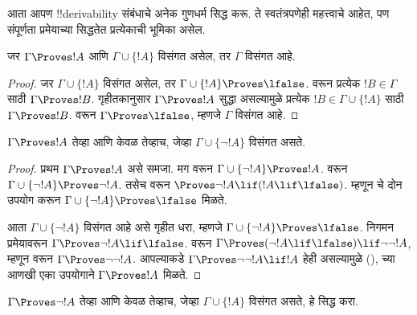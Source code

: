 \documentclass[../../../include/open-logic-section]{subfiles}
\begin{document}
      {}
      {}


आता आपण !!{derivability} संबंधाचे अनेक गुणधर्म सिद्ध करू. ते स्वतंत्रपणेही
महत्त्वाचे आहेत, पण संपूर्णता प्रमेयाच्या सिद्धतेत प्रत्येकाची भूमिका असेल.

\begin{prop}
  जर $\Gamma \Proves !A$ आणि $\Gamma \cup \{!A\}$ विसंगत असेल, तर
  $\Gamma$ विसंगत आहे.
\end{prop}

\begin{proof}
  जर $\Gamma \cup \{!A\}$ विसंगत असेल, तर $\Gamma \cup \{!A\}
  \Proves \lfalse$.  वरून प्रत्येक
  $!B \in \Gamma$ साठी $\Gamma \Proves !B$. गृहीतकानुसार
  $\Gamma \Proves !A$ सुद्धा असल्यामुळे प्रत्येक $!B \in \Gamma \cup
  \{!A\}$ साठी $\Gamma \Proves !B$. 
  वरून $\Gamma \Proves \lfalse$, म्हणजे $\Gamma$ विसंगत आहे.
\end{proof}

\begin{prop}
$\Gamma \Proves !A$ तेव्हा आणि केवळ तेव्हाच, जेव्हा $\Gamma \cup \{\lnot !A\}$
विसंगत असते.
\end{prop}

\begin{proof}
प्रथम $\Gamma \Proves !A$ असे समजा. मग 
वरून $\Gamma \cup \{\lnot !A\} \Proves !A$. 
वरून $\Gamma \cup \{\lnot !A\} \Proves \lnot !A$. तसेच
 वरून $\Proves \lnot !A \lif (!A \lif \lfalse)$.
म्हणून  चे दोन उपयोग करून $\Gamma \cup \{\lnot
!A\} \Proves \lfalse$ मिळते.

आता $\Gamma \cup \{\lnot !A\}$ विसंगत आहे असे गृहीत धरा, म्हणजे
$\Gamma \cup \{\lnot !A\} \Proves \lfalse$. निगमन प्रमेयावरून $\Gamma
\Proves \lnot !A \lif \lfalse$.  वरून $\Gamma
\Proves (\lnot !A \lif \lfalse) \lif \lnot\lnot !A$, म्हणून
 वरून $\Gamma \Proves \lnot\lnot !A$. आपल्याकडे
$\Gamma \Proves \lnot\lnot !A \lif !A$ हेही असल्यामुळे
(),  च्या आणखी एका उपयोगाने
$\Gamma \Proves !A$ मिळते.
\end{proof}

\begin{prob}
$\Gamma \Proves \lnot !A$ तेव्हा आणि केवळ तेव्हाच, जेव्हा $\Gamma \cup \{!A\}$
विसंगत असते, हे सिद्ध करा.
\end{prob}
\end{document}
